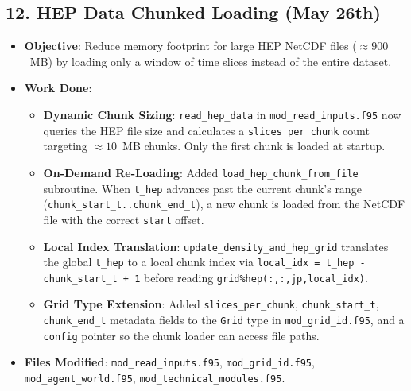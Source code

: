 \subsection{12. HEP Data Chunked Loading (May 26th)}
\begin{itemize}
\item \textbf{Objective}: Reduce memory footprint for large HEP NetCDF files ($\approx 900$~MB) by loading only a window of time slices instead of the entire dataset.
\item \textbf{Work Done}:
\begin{itemize}
\item \textbf{Dynamic Chunk Sizing}: \texttt{read\_hep\_data} in \texttt{mod\_read\_inputs.f95} now queries the HEP file size and calculates a \texttt{slices\_per\_chunk} count targeting $\approx 10$~MB chunks. Only the first chunk is loaded at startup.
\item \textbf{On-Demand Re-Loading}: Added \texttt{load\_hep\_chunk\_from\_file} subroutine. When \texttt{t\_hep} advances past the current chunk's range (\texttt{chunk\_start\_t..chunk\_end\_t}), a new chunk is loaded from the NetCDF file with the correct \texttt{start} offset.
\item \textbf{Local Index Translation}: \texttt{update\_density\_and\_hep\_grid} translates the global \texttt{t\_hep} to a local chunk index via \texttt{local\_idx = t\_hep - chunk\_start\_t + 1} before reading \texttt{grid\%hep(:,:,jp,local\_idx)}.
\item \textbf{Grid Type Extension}: Added \texttt{slices\_per\_chunk}, \texttt{chunk\_start\_t}, \texttt{chunk\_end\_t} metadata fields to the \texttt{Grid} type in \texttt{mod\_grid\_id.f95}, and a \texttt{config} pointer so the chunk loader can access file paths.
\end{itemize}
\item \textbf{Files Modified}: \texttt{mod\_read\_inputs.f95}, \texttt{mod\_grid\_id.f95}, \texttt{mod\_agent\_world.f95}, \texttt{mod\_technical\_modules.f95}.
\end{itemize}

